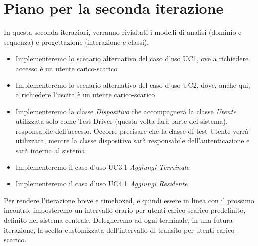 \documentclass[12pt, letterpaper]{article}
\begin{document}
\section{Piano per la seconda iterazione}
In questa seconda iterazioni, verranno rivisitati 
i modelli di analisi (dominio e sequenza) e 
progettazione (interazione e classi).
\begin{itemize}
    \item Implementeremo lo scenario alternativo del 
    caso d'uso UC1, ove a richiedere accesso è un 
    utente carico-scarico
    \item Implementeremo lo scenario alternativo del 
    caso d'uso UC2, dove, anche qui, a richiedere 
    l'uscita è un utente carico-scarico
    \item Implementeremo la classe \emph{Dispositivo}
    che accompagnerà la classe \emph{Utente} utilizzata
    solo come Test Driver (questa volta farà parte 
    del sistema), responsabile dell'accesso.
    Occorre precisare che la classe di test Utente 
    verrà utilizzata, mentre la classe dispositivo 
    sarà responsabile dell'autenticazione e sarà 
    interna al sistema
    \item Implementeremo il caso d'uso UC3.1 
    \emph{Aggiungi Terminale}
    \item Implementeremo il caso d'uso UC4.1 
    \emph{Aggiungi Residente}
\end{itemize}

\noindent
Per rendere l'iterazione breve e timeboxed,
e quindi essere in linea con il prossimo
incontro, imposteremo un intervallo orario
per utenti carico-scarico predefinito, definito 
nel sistema centrale. Delegheremo ad ogni 
terminale, in una futura iterazione, la scelta
customizzata dell'intervallo di transito per 
utenti carico-scarico.
\end{document}
